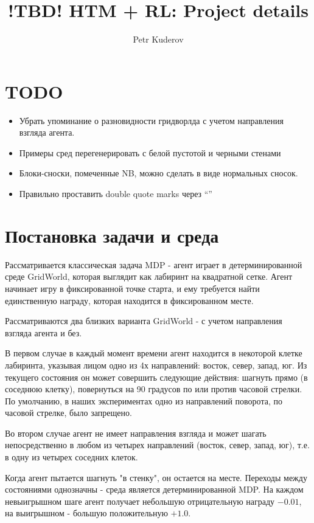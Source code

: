 \documentclass[a4paper]{article}
\begin{document}
\title {!TBD! HTM + RL: Project details}
\author {Petr Kuderov}
\maketitle

\section{TODO}

\begin{itemize}
  \item Убрать упоминание о разновидности гридворлда с учетом направления взгляда агента.
  \item Примеры сред перегенерировать с белой пустотой и черными стенами
  \item Блоки-сноски, помеченные NB, можно сделать в виде нормальных сносок.
  \item Правильно проставить double quote marks через ``''
\end{itemize}

\section {Постановка задачи и среда}

Рассматривается классическая задача MDP - агент играет в детерминированной среде GridWorld, которая выглядит как лабиринт на квадратной сетке. Агент начинает игру в фиксированной точке старта, и ему требуется найти единственную награду, которая находится в фиксированном месте.

Рассматриваются два близких варианта GridWorld - с учетом направления взгляда агента и без.

В первом случае в каждый момент времени агент находится в некоторой клетке лабиринта, указывая лицом одно из 4х направлений: восток, север, запад, юг. Из текущего состояния он может совершить следующие действия: шагнуть прямо (в соседнюю клетку), повернуться на 90 градусов по или против часовой стрелки. По умолчанию, в наших экспериментах одно из направлений поворота, по часовой стрелке, было запрещено.

Во втором случае агент не имеет направления взгляда и может шагать непосредственно в любом из четырех направлений (восток, север, запад, юг), т.е. в одну из четырех соседних клеток.

Когда агент пытается шагнуть "в стенку", он остается на месте. Переходы между состояниями однозначны - среда является детерминированной MDP. На каждом невыигрышном шаге агент получает небольшую отрицательную награду $-0.01$, на выигрышном - большую положительную $+1.0$.
\end{document}
